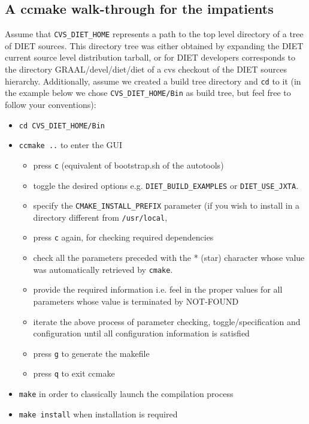 \subsection{A ccmake walk-through for the impatients}

Assume that \verb+CVS_DIET_HOME+ represents a path to the top level
directory of a tree of DIET sources.
This directory tree was either obtained by expanding the DIET current
source level distribution tarball, or for DIET developers corresponds to
the directory GRAAL/devel/diet/diet of a cvs checkout of the DIET sources
hierarchy.
Additionally, assume we created a build tree directory and \verb+cd+
to it (in the example below we chose \verb+CVS_DIET_HOME/Bin+ as
build tree, but feel free to follow your conventions):
\begin{itemize}
\item
  \verb+cd CVS_DIET_HOME/Bin+
\item
  \verb+ccmake ..+ to enter the GUI
  \begin{itemize}
  \item press \verb+c+ (equivalent of bootstrap.sh of the autotools)
  \item toggle the desired options e.g. \verb+DIET_BUILD_EXAMPLES+ or
     \verb+DIET_USE_JXTA+. 
  \item specify the \verb+CMAKE_INSTALL_PREFIX+ parameter (if you wish
     to install in a directory different from \verb+/usr/local+,
  \item press \verb+c+ again, for checking required dependencies
  \item check all the parameters preceded with the * (star) character
     whose value was automatically retrieved by \verb+cmake+.
  \item provide the required information i.e. feel in the proper values
     for all parameters whose value is terminated by NOT-FOUND
  \item iterate the above process of parameter checking, toggle/specification
     and configuration until all configuration information is satisfied
  \item press \verb+g+ to generate the makefile
  \item press \verb+q+ to exit ccmake
  \end{itemize}
\item
  \verb+make+ in order to classically launch the compilation process
\item
  \verb+make install+ when installation is required
\end{itemize}


